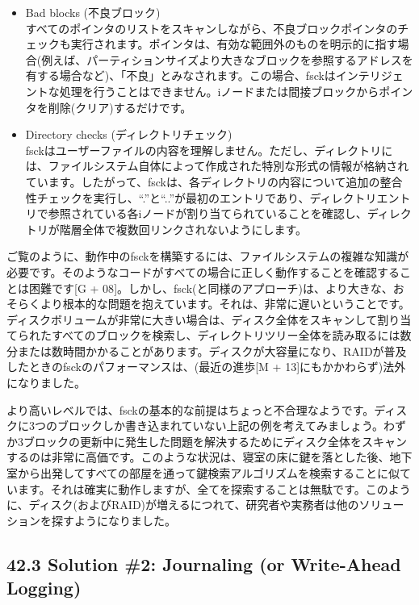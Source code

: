 \begin{itemize}
\item
  Bad blocks (不良ブロック)\\
  すべてのポインタのリストをスキャンしながら、不良ブロックポインタのチェックも実行されます。ポインタは、有効な範囲外のものを明示的に指す場合(例えば、パーティションサイズより大きなブロックを参照するアドレスを有する場合など)、「不良」とみなされます。この場合、fsckはインテリジェントな処理を行うことはできません。iノードまたは間接ブロックからポインタを削除(クリア)するだけです。
\item
  Directory checks (ディレクトリチェック)\\
  fsckはユーザーファイルの内容を理解しません。ただし、ディレクトリには、ファイルシステム自体によって作成された特別な形式の情報が格納されています。したがって、fsckは、各ディレクトリの内容について追加の整合性チェックを実行し、``.''と``..''が最初のエントリであり、ディレクトリエントリで参照されている各iノードが割り当てられていることを確認し、ディレクトリが階層全体で複数回リンクされないようにします。
\end{itemize}

ご覧のように、動作中のfsckを構築するには、ファイルシステムの複雑な知識が必要です。そのようなコードがすべての場合に正しく動作することを確認することは困難です{[}G
+
08{]}。しかし、fsck(と同様のアプローチ)は、より大きな、おそらくより根本的な問題を抱えています。それは、非常に遅いということです。ディスクボリュームが非常に大きい場合は、ディスク全体をスキャンして割り当てられたすべてのブロックを検索し、ディレクトリツリー全体を読み取るには数分または数時間かかることがあります。ディスクが大容量になり、RAIDが普及したときのfsckのパフォーマンスは、(最近の進歩{[}M
+ 13{]}にもかかわらず)法外になりました。

より高いレベルでは、fsckの基本的な前提はちょっと不合理なようです。ディスクに3つのブロックしか書き込まれていない上記の例を考えてみましょう。わずか3ブロックの更新中に発生した問題を解決するためにディスク全体をスキャンするのは非常に高価です。このような状況は、寝室の床に鍵を落とした後、地下室から出発してすべての部屋を通って鍵検索アルゴリズムを検索することに似ています。それは確実に動作しますが、全てを探索することは無駄です。このように、ディスク(およびRAID)が増えるにつれて、研究者や実務者は他のソリューションを探すようになりました。

\hypertarget{solution-2-journaling-or-write-ahead-logging}{%
\subsection*{42.3 Solution \#2: Journaling (or Write-Ahead
Logging)}\label{solution-2-journaling-or-write-ahead-logging}}


